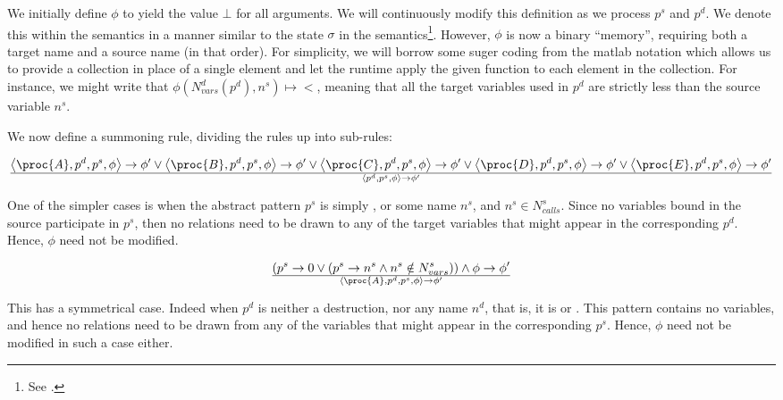 We initially define $\phi$ to yield the value $\bot$ for all arguments. We will
continuously modify this definition as we process $p^s$ and $p^d$. We denote
this within the semantics in a manner similar to the state $\sigma$ in the
semantics\footnote{See .}. However, $\phi$ is now a
binary ``memory'', requiring both a target name and a source name (in that
order). For simplicity, we will borrow some suger coding from the matlab
notation which allows us to provide a collection in place of a single element
and let the runtime apply the given function to each element in the collection.
For instance, we might write that $\phi\left(N_{vars}^d(p^d), n^s\right)\mapsto
<$, meaning that all the target variables used in $p^d$ are strictly less than
the source variable $n^s$.

We now define a summoning rule, dividing the rules up into sub-rules:

\begin{equation}
{
    \left\langle\proc{A},p^d,p^s,\phi\right\rangle
    \rightarrow
    \phi'
  \vee
    \left\langle\proc{B},p^d,p^s,\phi\right\rangle
    \rightarrow
    \phi'
  \vee
    \left\langle\proc{C},p^d,p^s,\phi\right\rangle
    \rightarrow
    \phi'
  \vee
    \left\langle\proc{D},p^d,p^s,\phi\right\rangle
    \rightarrow
    \phi'
  \vee
    \left\langle\proc{E},p^d,p^s,\phi\right\rangle
    \rightarrow
    \phi'
}\over{
  \left\langle p^d,p^s,\phi\right\rangle
  \rightarrow
  \phi'
}
\end{equation}

One of the simpler cases is when the abstract pattern $p^s$ is simply ,
or some name $n^s$, and $n^s\in N_{calls}^s$. Since no variables bound in the
source participate in $p^s$, then no relations need to be drawn to any of the
target variables that might appear in the corresponding $p^d$. Hence, $\phi$
need not be modified.

\begin{equation}\label{eq:sct-pattern-source-fail}
{
\left(
    p^s\rightarrow 0
  \vee
\left(
    p^s\rightarrow n^s
  \wedge
    n^s\notin N_{vars}^s
\right)
\right)
  \wedge
    \phi\rightarrow\phi'
}\over{
  \left\langle\proc{A},p^d,p^s,\phi\right\rangle
  \rightarrow
  \phi'
}
\end{equation}

This has a symmetrical case. Indeed when $p^d$ is neither a destruction, nor
any name $n^d$, that is, it is \mono{\_} or . This pattern contains no
variables, and hence  no relations need to be drawn from any of the variables
that might appear in the corresponding $p^s$. Hence, $\phi$ need not be
modified in such a case either.

